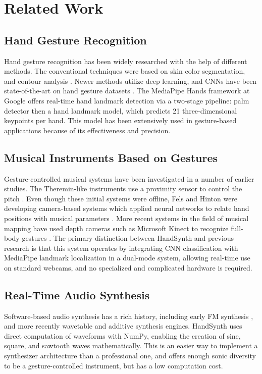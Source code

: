 \documentclass[conference]{IEEEtran}
\begin{document}
\section{Related Work}

\subsection{Hand Gesture Recognition}

Hand gesture recognition has been widely researched with the help of different methods. The conventional techniques were based on skin color segmentation, and contour analysis \cite{pisharady2015recent}. Newer methods utilize deep learning, and CNNs have been state-of-the-art on hand gesture datasets \cite{molchanov2015hand}. The MediaPipe Hands framework at Google \cite{zhang2020mediapipe} offers real-time hand landmark detection via a two-stage pipeline: palm detector then a hand landmark model, which predicts 21 three-dimensional keypoints per hand. This model has been extensively used in gesture-based applications because of its effectiveness and precision.

\subsection{Musical Instruments Based on Gestures}

Gesture-controlled musical systems have been investigated in a number of earlier studies. The Theremin-like instruments use a proximity sensor to control the pitch \cite{paradiso1997electronic}. Even though these initial systems were offline, Fels and Hinton were developing camera-based systems which applied neural networks to relate hand positions with musical parameters \cite{fels1993glove}. More recent systems in the field of musical mapping have used depth cameras such as Microsoft Kinect to recognize full-body gestures \cite{han2017space}. The primary distinction between HandSynth and previous research is that this system operates by integrating CNN classification with MediaPipe landmark localization in a dual-mode system, allowing real-time use on standard webcams, and no specialized and complicated hardware is required.

\subsection{Real-Time Audio Synthesis}

Software-based audio synthesis has a rich history, including early FM synthesis \cite{chowning1973synthesis}, and more recently wavetable and additive synthesis engines. HandSynth uses direct computation of waveforms with NumPy, enabling the creation of sine, square, and sawtooth waves mathematically. This is an easier way to implement a synthesizer architecture than a professional one, and offers enough sonic diversity to be a gesture-controlled instrument, but has a low computation cost.
\end{document}
